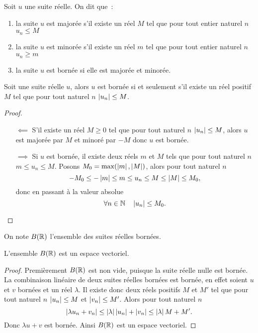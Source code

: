\begin{defdef}
  Soit $u$ une suite réelle. On dit que~:
  \begin{enumerate}
  \item la suite $u$ est majorée s'il existe un réel $M$ tel que pour tout entier naturel $n$ $u_n\leq M$
  \item la suite $u$ est minorée s'il existe un réel $m$ tel que pour tout entier naturel $n$ $u_n\geq m$
  \item la suite $u$ est bornée si elle est majorée et minorée.
  \end{enumerate}
\end{defdef}
\begin{prop}
  Soit une suite réelle $u$, alors $u$ est bornée si et seulement s'il existe un réel positif $M$ tel que pour tout naturel $n$ $\left\lvert u_n\right\rvert\leq M$.
\end{prop}
\begin{proof}
  \begin{itemize}
  \item[$\impliedby$] S'il existe un réel $M\geq 0$ tel que pour tout naturel $n$ $\left\lvert u_n\right\rvert\leq M$, alors $u$ est majorée par $M$ et minoré par $-M$ donc $u$ est bornée.
  \item[$\implies$] Si $u$ est bornée, il existe deux réels $m$ et $M$ tels que pour tout naturel $n$ $m\leq u_n \leq M$. Posons $M_0=\max(\left\lvert m\right\rvert,\left\lvert M\right\rvert)$, alors pour tout naturel $n$
    \begin{equation}
      -M_0\leq -\left\lvert m\right\rvert \leq m\leq u_n\leq M\leq \left\lvert M\right\rvert\leq M_0,
    \end{equation}
    donc en passant à la valeur absolue
    \begin{equation}
      \forall n \in \mathbb{N} \quad \left\lvert u_n\right\rvert\leq M_0.
    \end{equation}
  \end{itemize}
\end{proof}
On note $B(\mathbb{R})$ l'ensemble des suites réelles bornées.
\begin{prop}
  L'ensemble $B(\mathbb{R})$ est un espace vectoriel.
\end{prop}
\begin{proof}
  Premièrement $B(\mathbb{R})$ est non vide, puisque la suite réelle nulle est bornée. La combinaison linéaire de deux suites réelles bornées est bornée, en effet soient $u$ et $v$ bornées et un réel $\lambda$. Il existe donc deux réels positifs $M$ et $M'$ tel que pour tout naturel $n$ $\left\lvert u_n\right\rvert\leq M$ et $\left\lvert v_n\right\rvert\leq M'$. Alors pour tout naturel $n$
  \begin{equation}
    \left\lvert\lambda u_n + v_n\right\rvert\leq \left\lvert\lambda\right\rvert\left\lvert u_n\right\rvert+\left\lvert v_n\right\rvert\leq \left\lvert\lambda\right\rvert M+M'.
  \end{equation}
Donc $\lambda u+v$ est bornée. Ainsi $B(\mathbb{R})$ est un espace vectoriel.
\end{proof}
